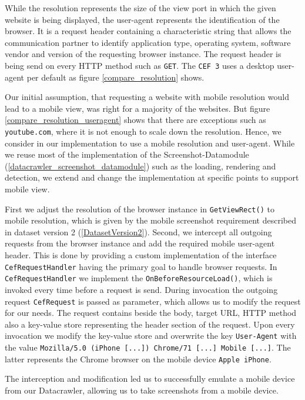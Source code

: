 While the resolution represents the size of the view port in which the given website is being displayed, the user-agent represents the identification of the browser. It is a request header containing a characteristic string that allows the communication partner to identify application type, operating system, software vendor and version of the requesting browser instance. The request header is being send on every HTTP method such as \texttt{GET}. The \texttt{CEF 3} uses a desktop user-agent per default as figure \ref{compare_resolution} shows.

Our initial assumption, that requesting a website with mobile resolution would lead to a mobile view, was right for a majority of the websites. But figure \ref{compare_resolution_useragent} shows that there are exceptions such as \texttt{youtube.com}, where it is not enough to scale down the resolution. Hence, we consider in our implementation to use a mobile resolution and user-agent. While we reuse most of the implementation of the Screenshot-Datamodule (\ref{datacrawler_screenshot_datamodule}) such as the loading, rendering and detection, we extend and change the implementation at specific points to support mobile view.

First we adjust the resolution of the browser instance in \texttt{GetViewRect()} to mobile resolution, which is given by the mobile screenshot requirement described in dataset version 2 (\ref{DatasetVersion2}). Second, we intercept all outgoing requests from the browser instance and add the required mobile user-agent header. This is done by providing a custom implementation of the interface \texttt{CefRequestHandler} having the primary goal to handle browser requests. In \texttt{CefRequestHandler} we implement the \texttt{OnBeforeResourceLoad()}, which is invoked every time before a request is send. During invocation the outgoing request \texttt{CefRequest} is passed as parameter, which allows us to modify the request for our needs. The request contains beside the body, target URL, HTTP method also a key-value store representing the header section of the request. Upon every invocation we modify the key-value store and overwrite the key \texttt{User-Agent} with the value \texttt{Mozilla/5.0 (iPhone [...]) Chrome/71 [...] Mobile [...]}. The latter represents the Chrome browser on the mobile device \texttt{Apple iPhone}. 

The interception and modification led us to successfully emulate a mobile device from our Datacrawler, allowing us to take screenshots from a mobile device.

